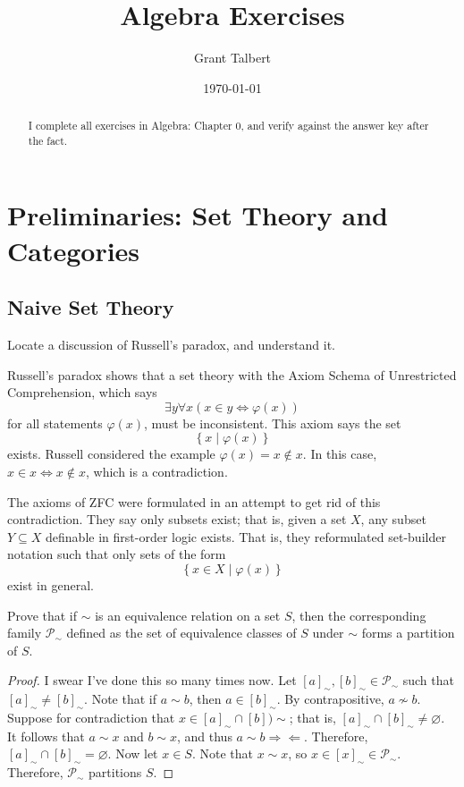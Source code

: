 \documentclass[11pt]{report}
\title{Algebra Exercises}
\author{Grant Talbert}
\date{\today}
\newcommand{\contradiction}{\Longrightarrow\Longleftarrow}
\begin{document}
\makereport
\begin{abstract}
	I complete all exercises in Algebra: Chapter 0, and verify against the answer key after the fact.
\end{abstract}
\tableofcontents
\chapter{Preliminaries: Set Theory and Categories}
\section{Naive Set Theory}
\begin{exercise}
	Locate a discussion of Russell's paradox, and understand it.
\end{exercise}
\begin{solution}
	Russell's paradox shows that a set theory with the Axiom Schema of Unrestricted Comprehension, which says
	\[
		\exists y\forall x\left( x\in y\iff \varphi (x) \right) 
	\]
	for all statements $\varphi (x)$, must be inconsistent. This axiom says the set
	\[
		\left\{ x \mid \varphi (x) \right\} 
	\]
	exists.	Russell considered the example $\varphi (x)=x\notin x$. In this case, $x\in x \iff x \notin x$, which is a contradiction.

	The axioms of ZFC were formulated in an attempt to get rid of this contradiction. They say only subsets exist; that is, given a set $X$, any subset $Y\subseteq X$ definable in first-order logic exists. That is, they reformulated set-builder notation such that only sets of the form
	\[
		\left\{ x\in X \mid \varphi (x) \right\} 
	\]
	exist in general.
\end{solution}
\begin{exercise}
	Prove that if $\sim $ is an equivalence relation on a set $S$, then the corresponding family $\mathscr{P}_{\sim }$ defined as the set of equivalence classes of $S$ under $\sim $ forms a partition of $S$.
\end{exercise}
\begin{proof}
	I swear I've done this so many times now. Let $[a]_\sim ,[b]_\sim \in \mathscr{P} _\sim $ such that $[a]_\sim \neq [b]_\sim $. Note that if $a\sim b$, then $a\in [b]_\sim $. By contrapositive, $a\nsim b$. Suppose for contradiction that $x\in [a]_\sim \cap [b])\sim $; that is, $[a]_\sim \cap [b]_\sim \neq \varnothing$. It follows that $a\sim x$ and $b\sim x$, and thus $a\sim b \contradiction $. Therefore, $[a]_\sim \cap [b]_\sim =\varnothing$. Now let $x\in S$. Note that $x\sim x$, so $x\in [x]_\sim \in \mathscr{P}_\sim  $. Therefore, $\mathscr{P} _\sim $ partitions $S$.
\end{proof}
\end{document}
